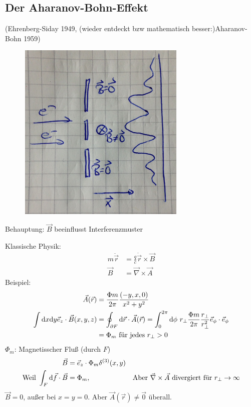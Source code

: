 \subsection{Der Aharanov-Bohn-Effekt} 
(Ehrenberg-Siday 1949, (wieder entdeckt bzw mathematisch besser:)Aharanov-Bohn 1959)
	\begin{figure} [h]
	\begin{center}
		\includegraphics[width=8cm]{Aharanov-Bohn-Effekt1}
	\end{center}
	\end{figure}
Behauptung: $\vec{B}$ beeinflusst Interferenzmuster

Klassische Physik:
	\begin{align*}
		m \ddot{\vec{r}} &= \frac{q}{c} \dot{\vec{r}} \times \vec{B} \\
		\vec{B} &= \vec{\nabla} \times \vec{A}
	\end{align*}
Beispiel:
	\begin{align*}
		\vec{A}(\vec{r}) &= \frac{\Phi m}{2\pi} \frac{(-y,x,0)}{x^2 + y^2} \\
		\int \mathrm{d} x \mathrm{d} y \vec{e}_z \cdot \vec{B}(x,y,z) &=
		\oint_{\partial F} \mathrm{d} \vec{r} \cdot \vec{A}(\vec{r})=
		\int_{0}^{2 \pi} \mathrm{d} \phi ~r_{\perp} \frac{\Phi m}{2 \pi} \frac{r_{\perp}}{r_{\perp}^2} \vec{e}_\phi \cdot \vec{e}_\phi \\
		&=\Phi_m ~\text{für jedes } r_{\perp} > 0
	\end{align*}
$\Phi_m$: Magnetisscher Fluß (durch $F$)
	\begin{align*}
		\vec{B} &= \vec{e}_z \cdot \Phi_m \delta^{(3)}(x,y) \\
		\text{Weil } \int_F \mathrm{d} \vec{f} \cdot \vec{B} &= \Phi_m,&
		\text{Aber } \vec{\nabla} \times \vec{A} \text{ divergiert für } r_{\perp} \rightarrow \infty
	\end{align*}
$\vec{B} = 0$, außer bei $x=y=0$. Aber $\vec{A}(\vec{r}) \neq \vec{0}$ überall.

